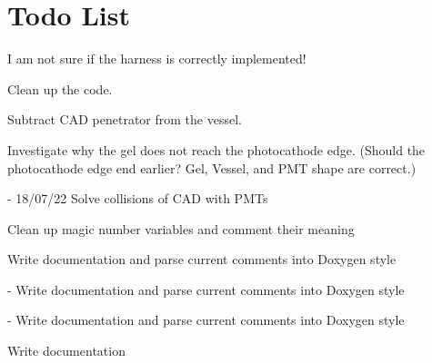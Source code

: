 \chapter{Todo List}
\hypertarget{todo}{}\label{todo}

\begin{DoxyRefList}
\item[Member \doxylink{class_d_e_g_g_a6af6697e49866ad1c9c15a8182b86cbf}{DEGG\+::DEGG} (G4bool p\+\_\+place\+Harness=true)]\label{todo__todo000004}%
%

\begin{DoxyItemize}
\item I am not sure if the harness is correctly implemented!
\item Clean up the code.
\item Subtract CAD penetrator from the vessel.
\item Investigate why the gel does not reach the photocathode edge. (Should the photocathode edge end earlier? Gel, Vessel, and PMT shape are correct.)  
\end{DoxyItemize}
\item[Member \doxylink{class_l_o_m16_a93c141790620554394cdf9864096d011}{LOM16\+::\texorpdfstring{$\sim$}{\string~}\+LOM16} ()]\label{todo__todo000005}%
%
-\/ 18/07/22 Solve collisions of CAD with PMTs
\begin{DoxyItemize}
\item Clean up magic number variables and comment their meaning
\item Write documentation and parse current comments into Doxygen style  
\end{DoxyItemize}
\item[Member \doxylink{classm_d_o_m_afd95205edb92f86b5c8d4e5642a58e3c}{m\+DOM\+::\texorpdfstring{$\sim$}{\string~}m\+DOM} ()]\label{todo__todo000007}%
%
-\/ Write documentation and parse current comments into Doxygen style  
\item[Member \doxylink{classm_d_o_m_harness_ad83b869a9aa373be038889f61608d3c6}{m\+DOMHarness\+::m\+DOMHarness} (\doxylink{classm_d_o_m}{m\+DOM} \texorpdfstring{$\ast$}{*}p\+MDOM)]\label{todo__todo000008}%
%
-\/ Write documentation and parse current comments into Doxygen style  
\item[File \doxylink{_o_m_sim_d_e_g_g_harness_8hh}{OMSim\+DEGGHarness.hh} ]\label{todo__todo000003}%
%
Write documentation



\end{DoxyRefList}
